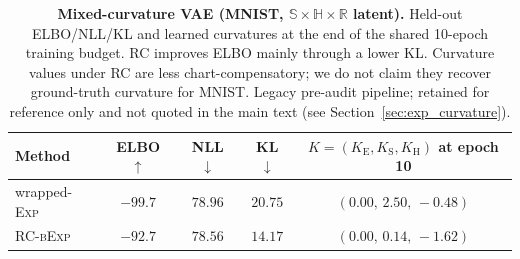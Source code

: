 \documentclass{article}
\theoremstyle{definition}
\theoremstyle{remark}
\newcommand{\RR}{\mathbb{R}}
\newcommand{\SSS}{\mathbb{S}}
\newcommand{\HH}{\mathbb{H}}
\begin{document}
\begin{table}[t]
  \centering
  \caption{\textbf{Mixed-curvature VAE (MNIST, $\SSS\times\HH\times\RR$ latent).}
  Held-out ELBO/NLL/KL and learned curvatures at the end of the shared
  10-epoch training budget. RC improves ELBO mainly through a lower KL.
  Curvature values under RC are less chart-compensatory; we do not claim
  they recover ground-truth curvature for MNIST. Legacy pre-audit pipeline; retained for reference only and not quoted in the main text (see Section~\ref{sec:exp_curvature}).}
  \label{tab:mixed_curvature_vae}
  \small
  \setlength{\tabcolsep}{4pt}
  \begin{tabular}{lcccc}
    \toprule
    Method & ELBO $\uparrow$ & NLL $\downarrow$ & KL $\downarrow$ &
    $K=(K_{\mathrm{E}},K_{\mathrm{S}},K_{\mathrm{H}})$ at epoch 10 \\
    \midrule
    wrapped-\textsc{Exp} & $-99.7$ & $78.96$ & $20.75$ & $(0.00,\,2.50,\,-0.48)$ \\
    \textsc{RC-bExp}    & $\mathbf{-92.7}$ & $\mathbf{78.56}$ & $\mathbf{14.17}$ & $(0.00,\,0.14,\,-1.62)$ \\
    \bottomrule
  \end{tabular}
\end{table}
\end{document}

